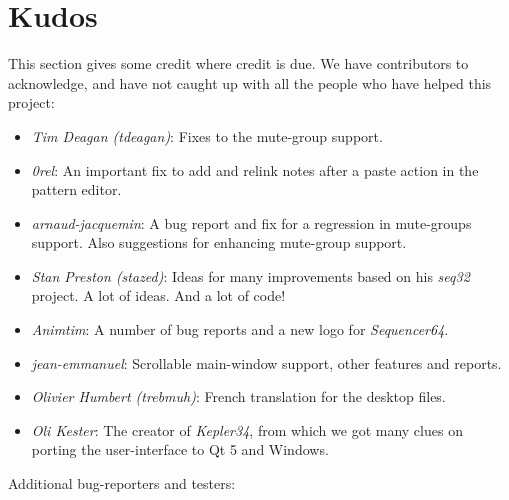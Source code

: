 %
%
%

\section{Kudos}
\label{sec:kudos}

   This section gives some credit where credit is due.
   We have contributors to acknowledge, and have not caught up with all the
   people who have helped this project:

   \begin{itemize}
      \item \textsl{Tim Deagan (tdeagan)}:
         Fixes to the mute-group support.
      \item \textsl{0rel}:
         An important fix to add and relink notes after a
         paste action in the pattern editor.
      \item \textsl{arnaud-jacquemin}:
         A bug report and fix for a regression in mute-groups support.
         Also suggestions for enhancing mute-group support.
      \item \textsl{Stan Preston (stazed)}:
         Ideas for many improvements based
         on his \textsl{seq32} project.  A lot of ideas.
         And a lot of code!
      \item \textsl{Animtim}:
         A number of bug reports and a new logo for \textsl{Sequencer64}.
      \item \textsl{jean-emmanuel}:
         Scrollable main-window support, other features and reports.
      \item \textsl{Olivier Humbert (trebmuh)}:
         French translation for the desktop files.
      \item \textsl{Oli Kester}:
         The creator of \textsl{Kepler34}, from which we got many
         clues on porting the user-interface to Qt 5 and Windows.
   \end{itemize}

   Additional bug-reporters and testers:

